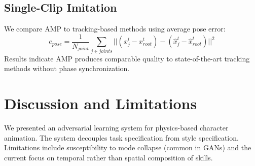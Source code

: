 \documentclass[acmtog]{acmart}
\begin{document}
\subsection{Single-Clip Imitation}
We compare AMP to tracking-based methods using average pose error:
\begin{equation}
    e_{pose} = \frac{1}{N_{joint}} \sum_{j \in joints} ||(x_j^t - x_{root}^t) - (\hat{x}_j^t - \hat{x}_{root}^t)||^2
\end{equation}
Results indicate AMP produces comparable quality to state-of-the-art tracking methods without phase synchronization.

\section{Discussion and Limitations}
We presented an adversarial learning system for physics-based character animation. The system decouples task specification from style specification. Limitations include susceptibility to mode collapse (common in GANs) and the current focus on temporal rather than spatial composition of skills.
\end{document}
